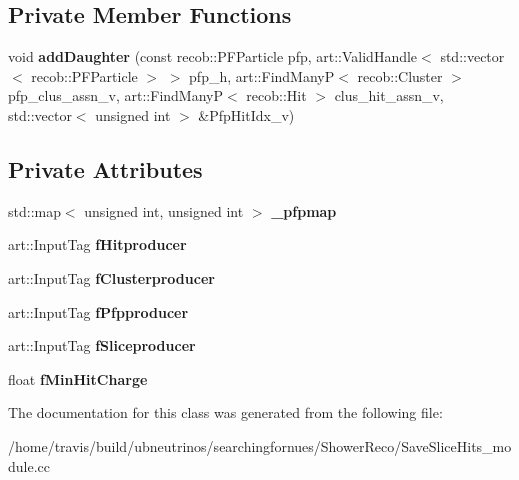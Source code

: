 \subsection*{Private Member Functions}
\begin{DoxyCompactItemize}
\item 
void {\bfseries add\+Daughter} (const recob\+::\+P\+F\+Particle pfp, art\+::\+Valid\+Handle$<$ std\+::vector$<$ recob\+::\+P\+F\+Particle $>$ $>$ pfp\+\_\+h, art\+::\+Find\+ManyP$<$ recob\+::\+Cluster $>$ pfp\+\_\+clus\+\_\+assn\+\_\+v, art\+::\+Find\+ManyP$<$ recob\+::\+Hit $>$ clus\+\_\+hit\+\_\+assn\+\_\+v, std\+::vector$<$ unsigned int $>$ \&Pfp\+Hit\+Idx\+\_\+v)\hypertarget{classSaveSliceHits_a13bfe5d175be84fe7b949a967a5da465}{}\label{classSaveSliceHits_a13bfe5d175be84fe7b949a967a5da465}

\end{DoxyCompactItemize}
\subsection*{Private Attributes}
\begin{DoxyCompactItemize}
\item 
std\+::map$<$ unsigned int, unsigned int $>$ {\bfseries \+\_\+pfpmap}\hypertarget{classSaveSliceHits_a4a8537787643bd309b910620bcb2e154}{}\label{classSaveSliceHits_a4a8537787643bd309b910620bcb2e154}

\item 
art\+::\+Input\+Tag {\bfseries f\+Hitproducer}\hypertarget{classSaveSliceHits_a6a289d782481d17dc39c931d62d0f31c}{}\label{classSaveSliceHits_a6a289d782481d17dc39c931d62d0f31c}

\item 
art\+::\+Input\+Tag {\bfseries f\+Clusterproducer}\hypertarget{classSaveSliceHits_a4e6d5a3f1ab4ddc732f5758a3759effa}{}\label{classSaveSliceHits_a4e6d5a3f1ab4ddc732f5758a3759effa}

\item 
art\+::\+Input\+Tag {\bfseries f\+Pfpproducer}\hypertarget{classSaveSliceHits_ac2f381959f9bc912590888c6a86c8965}{}\label{classSaveSliceHits_ac2f381959f9bc912590888c6a86c8965}

\item 
art\+::\+Input\+Tag {\bfseries f\+Sliceproducer}\hypertarget{classSaveSliceHits_a942b1c4ea132e951aa39637e2f5d3e21}{}\label{classSaveSliceHits_a942b1c4ea132e951aa39637e2f5d3e21}

\item 
float {\bfseries f\+Min\+Hit\+Charge}\hypertarget{classSaveSliceHits_a68cfd0c337276c49f781fa06495effb1}{}\label{classSaveSliceHits_a68cfd0c337276c49f781fa06495effb1}

\end{DoxyCompactItemize}


The documentation for this class was generated from the following file\+:\begin{DoxyCompactItemize}
\item 
/home/travis/build/ubneutrinos/searchingfornues/\+Shower\+Reco/Save\+Slice\+Hits\+\_\+module.\+cc\end{DoxyCompactItemize}
